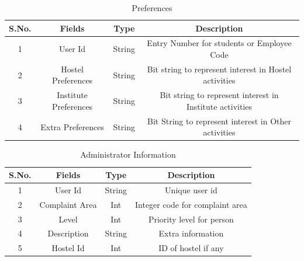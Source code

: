 \documentclass{article}
\begin{document}
\begin{table}[]
\centering
\caption{Preferences}
\label{my-label}
\begin{tabular}{|c|c|c|c|}
\hline
\textbf{S.No.} & \textbf{Fields}            & \textbf{Type} & \textbf{Description}                                             \\ \hline
1              & User Id                    & String        & Entry Number for students or Employee Code \\ \hline
2              & Hostel Preferences         & String        & Bit string to represent interest in Hostel activities            \\ \hline
3              & Institute Preferences & String        & Bit string to represent interest in Institute activities         \\ \hline
4              & Extra Preferences          & String        & Bit String to represent interest in Other activities             \\ \hline
\end{tabular}
\end{table}



\begin{table}[]
\centering
\caption{Administrator Information}
\label{my-label}
\begin{tabular}{|c|c|c|c|}
\hline
\textbf{S.No.} & \textbf{Fields} & \textbf{Type} & \textbf{Description}                                             \\ \hline
1              & User Id         & String        & Unique user id \\ \hline
2              & Complaint Area  & Int           & Integer code for complaint area                                  \\ \hline
3              & Level           & Int           & Priority level for person                                        \\ \hline
4              & Description     & String        & Extra information                                                \\ \hline
5 				& Hostel Id  & Int & ID of hostel if any \\ \hline
\end{tabular}
\end{table}
\end{document}
